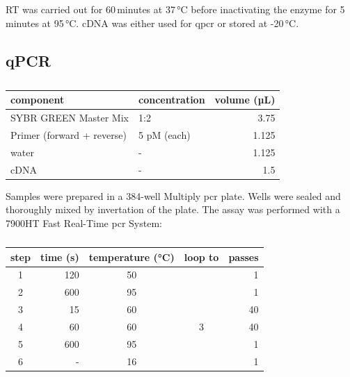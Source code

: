     \ac{RT} was carried out for 60\,minutes at 37\,°C before inactivating the enzyme for 5\,minutes at 95\,°C. \Ac{cDNA} was either used for \ac{qpcr} or stored at -20\,°C.

    \subsection{qPCR}
    \begin{table}[h]
    \capstart
	\centering
	\begin{minipage}{\captionwidth}
	   	\caption[qPCR samples]{}
	   	\label{tab:qPCR_MM}
	\end{minipage}
    \begin{tabular}{|l|l|r|}
        \hline
        component                  & concentration & volume (µL) \\ \hline
        SYBR GREEN Master Mix      & 1:2          & 3.75        \\
        Primer (forward + reverse) & 5 pM (each)  & 1.125       \\
        \ac{water}                        & -            & 1.125       \\
        \ac{cDNA}                       & -            & 1.5           \\ \hline
    \end{tabular}
    \end{table}
    Samples were prepared in a 384-well Multiply \ac{pcr} plate. Wells were sealed and thoroughly mixed by invertation of the plate. The assay was performed with a 7900HT Fast Real-Time \ac{pcr} System:

    \begin{table}[h]
    \capstart
    \centering
    \begin{minipage}{\captionwidth}
        \caption[qPCR programme]{}
        \label{tab:qPCR_programme}
    \end{minipage}
    \begin{tabular}{|c|r|c|c|r|}
    \hline
        step & time (s) & temperature (°C) & loop to & passes \\ \hline
        1    & 120      & 50               &         & 1      \\
        2    & 600      & 95               &         & 1      \\
        3    & 15       & 60               &         & 40     \\
        4    & 60       & 60               & 3       & 40     \\
        5    & 600      & 95               &         & 1      \\
        6    & -        & 16               &         & 1      \\ \hline
    \end{tabular}
    \end{table}

